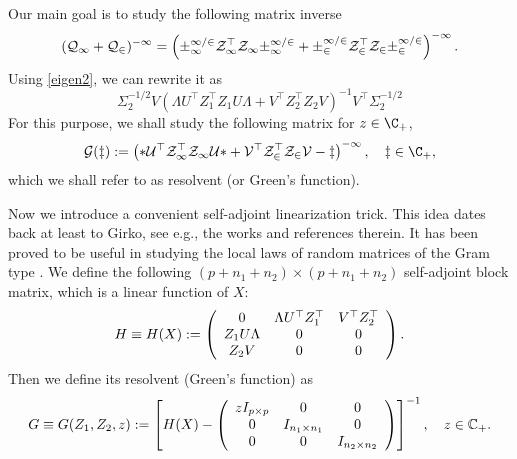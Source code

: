 Our main goal is to study the following matrix inverse
\begin{align*}
(\cal Q_1+\cal Q_2)^{-1}=\left( \Sigma_1^{1/2}Z_1^\top Z_1\Sigma_1^{1/2}+\Sigma_2^{1/2}Z_2^\top Z_2\Sigma_2^{1/2}\right)^{-1} .
\end{align*}
Using \eqref{eigen2}, we can rewrite it as
$$\Sigma_2^{-1/2}V\left(   \Lambda U^\top Z_1^\top Z_1 U\Lambda  + V^\top Z_2^\top Z_2V\right)^{-1}V^\top\Sigma_2^{-1/2}$$
For this purpose, we shall study the following matrix for $z\in \C_+$, 
$$\cal G(z):=\left(   \Lambda U^\top Z_1^\top Z_1 U\Lambda  + V^\top Z_2^\top Z_2V -z\right)^{-1},\quad z\in \C_+,$$
which we shall refer to as resolvent (or Green's function).

Now we introduce a convenient self-adjoint linearization trick. This idea dates back at least to Girko, see e.g., the works \cite{girko2012theory,girko1975random,girko1985spectral} and references therein. It has been proved to be useful in studying the local laws of random matrices of the Gram type \cite{Alt_Gram, AEK_Gram, Anisotropic, XYY_circular}. We define the following $(p+n_1+n_2)\times (p+n_1+n_2)$ self-adjoint block matrix, which is a linear function of $X$:
 \begin{equation}\label{linearize_block}
   H \equiv H(X): = \left( {\begin{array}{*{20}c}
   { 0 } & \Lambda U^{\top}Z_1^\top & V^\top Z_2^\top  \\
   {Z_1 U\Lambda  } & {0} & 0 \\
   {Z_2V} & 0 & 0
   \end{array}} \right).
 \end{equation}
Then we define its resolvent (Green's function) as
 \begin{equation}\label{eqn_defG}
 G \equiv G (Z_1,Z_2,z):= \left[H(X)-\left( {\begin{array}{*{20}c}
   { zI_{p\times p}} & 0 & 0 \\
   0 & { I_{n_1\times n_1}}  & 0\\
      0 & 0  & { I_{n_2\times n_2}}\\
\end{array}} \right)\right]^{-1} , \quad z\in \mathbb C_+ .
 \end{equation}

